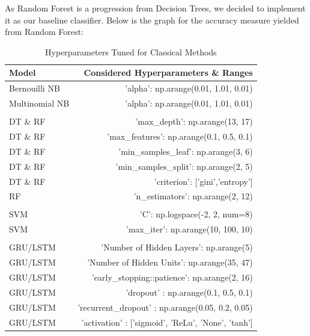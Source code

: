 \documentclass[comsoc,conference]{IEEEtran}
\begin{document}
As Random Forest is a progression from Decision Trees, we decided to implement it as our baseline classifier. Below is the graph for the accuracy measure yielded from Random Forest:




\begin{table}[h!]
\begin{tabularx}{\textwidth}{l r}
\toprule
Model & Considered Hyperparameters \& Ranges \\
\midrule
Bernouilli NB & 'alpha': np.arange(0.01, 1.01, 0.01) \\
Multinomial NB & 'alpha': np.arange(0.01, 1.01, 0.01) \\
\\
DT \& RF & 'max\_depth': np.arange(13, 17) \\
DT \& RF & 'max\_features': np.arange(0.1, 0.5, 0.1) \\
DT \& RF & 'min\_samples\_leaf': np.arange(3, 6) \\
DT \& RF & 'min\_samples\_split': np.arange(2, 5) \\
DT \& RF & 'criterion': ['gini','entropy'] \\
RF & 'n\_estimators': np.arange(2, 12) \\
\\
SVM & 'C': np.logspace(-2, 2, num=8) \\
SVM & 'max\_iter': np.arange(10, 100, 10) \\
\\
GRU/LSTM & 'Number of Hidden Layers': np.arange(5) \\
GRU/LSTM & 'Number of Hidden Units': np.arange(35, 47) \\
GRU/LSTM & 'early_stopping::patience': np.arange(2, 16) \\
GRU/LSTM & 'dropout' : np.arange(0.1, 0.5, 0.1) \\
GRU/LSTM & 'recurrent_dropout' : np.arange(0.05, 0.2, 0.05) \\
GRU/LSTM & 'activation' : ['sigmoid', 'ReLu', 'None', 'tanh'] \\
\bottomrule
\end{tabularx}
\label{my-label}
\caption{Hyperparameters Tuned for Classical Methods}
\end{table}
\end{document}

